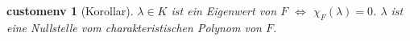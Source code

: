 \documentclass{report}
\newcommand{\lb}{\lambda}
\theoremstyle{customrem}
\theoremstyle{customdef}
\theoremstyle{customenv}
\newtheorem*{customenv}{customenv} %
\begin{document}
	\begin{customenv}[Korollar]
		\(\lb\in K\) ist ein Eigenwert von \(F\) \(\iff\) \(\chi_F(\lb) = 0\). \(\lb\) ist eine Nullstelle vom charakteristischen Polynom von \(F\).\linebreak
	\end{customenv}
	
	
\newpage
\renewcommand{\listtheoremname}{Satz- und Definitionsverzeichnis}
\listoftheorems[ignoreall, show={definition}, show={satz}, show={lemma}, show={definitionn}, show={korrolar}, show={altdefinition}]
\newpage
\printindex
\end{document}
